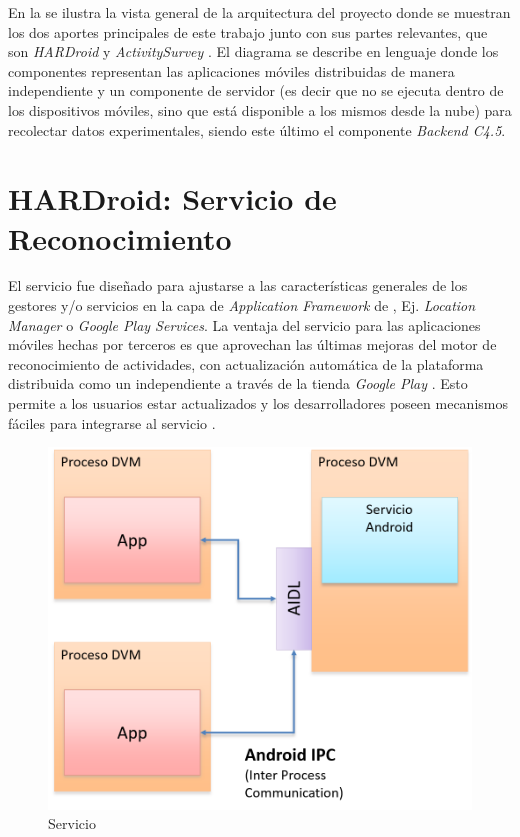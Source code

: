 En la  se ilustra la vista general de
la arquitectura del proyecto donde se muestran los dos aportes principales
de este trabajo junto con sus partes relevantes, que son \emph{HARDroid}
y \emph{ActivitySurvey} \cite{GimenezYegros2016b}. El diagrama se
describe en lenguaje  donde los componentes representan
las aplicaciones móviles distribuidas de manera independiente y un
componente de servidor (es decir que no se ejecuta dentro de los dispositivos
móviles, sino que está disponible a los mismos desde la nube) para
recolectar datos experimentales, siendo este último el componente
\emph{Backend C4.5}.

\section{HARDroid: Servicio de Reconocimiento}

\label{sec54:hardroid}El servicio \emph{ }fue diseñado
para ajustarse a las características generales de los gestores y/o
servicios en la capa de \emph{Application Framework} de \emph{},
Ej. \emph{Location Manager} o \emph{Google Play Services}. La ventaja
del servicio \emph{} para las aplicaciones móviles
hechas por terceros es que aprovechan las últimas mejoras del motor
de reconocimiento de actividades, con actualización automática de
la plataforma distribuida como un  independiente a través
de la tienda \emph{Google Play} \cite{GimenezYegros2016a}. Esto permite
a los usuarios estar actualizados y los desarrolladores poseen mecanismos
fáciles para integrarse al servicio .

\begin{figure}[H]
\begin{centering}
\includegraphics[width=0.7\columnwidth]{capitulo-5/graphics/hardroid_func}
\par\end{centering}
\caption[Servicio HARDroid]{\label{fig5:hardroid-func}Servicio }

\end{figure}

